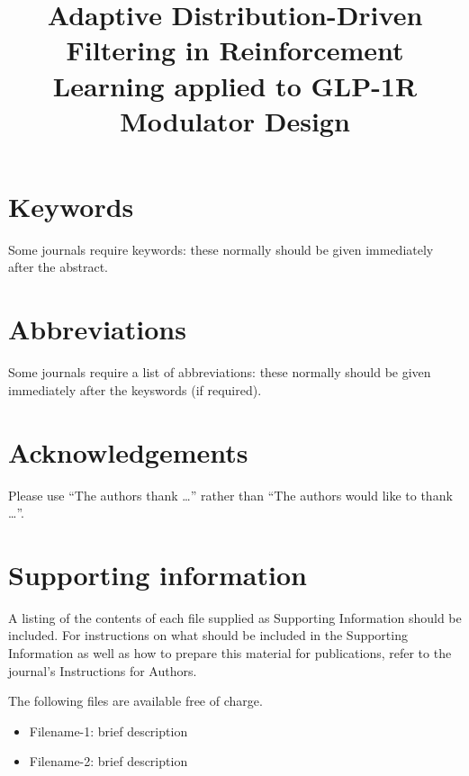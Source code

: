 \documentclass[letterpaper]{article}
\title{Adaptive Distribution-Driven Filtering in Reinforcement Learning applied to GLP-1R Modulator Design}
\begin{document}
\maketitle

\begin{abstract}

\end{abstract}

\section*{Keywords}

Some journals require keywords: these normally should be given immediately
after the abstract.

\section*{Abbreviations}

Some journals require a list of abbreviations: these normally should be given
immediately after the keyswords (if required).



\section*{Acknowledgements}

Please use ``The authors thank \ldots'' rather than ``The authors would like to
thank \ldots''.

\section*{Supporting information}

A listing of the contents of each file supplied as Supporting Information
should be included. For instructions on what should be included in the
Supporting Information as well as how to prepare this material for
publications, refer to the journal's Instructions for Authors.

The following files are available free of charge.
\begin{itemize}
  \item Filename-1: brief description
  \item Filename-2: brief description
\end{itemize}
\end{document}
